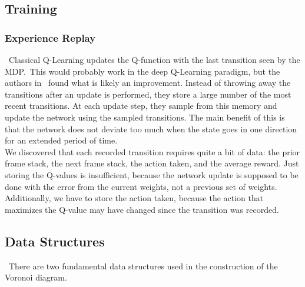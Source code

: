 \documentclass[conference]{IEEEtran}
\begin{document}
\subsection{Training}
\subsubsection{Experience Replay}
\noindent\ Classical Q-Learning updates the Q-function with the last transition
seen by the MDP.\ This would probably work in the deep Q-Learning paradigm, but
the authors in~\cite{mnih2013playing} found what is likely an improvement.
Instead of throwing away the transitions after an update is performed, they
store a large number of the most recent transitions. At each update step, they
sample from this memory and update the network using the sampled transitions.
The main benefit of this is that the network does not deviate too much when the
state goes in one direction for an extended period of time.\\
\indent We discovered that each recorded transition requires quite a bit of
data: the prior frame stack, the next frame stack, the action taken, and the
average reward. Just storing the Q-values is insufficient, because the network
update is supposed to be done with the error from the current weights, not a
previous set of weights. Additionally, we have to store the action taken,
because the action that maximizes the Q-value may have changed since the
transition was recorded.

\subsection{Data Structures}
\noindent\ There are two fundamental data structures used in the construction of the Voronoi
diagram.
\end{document}
